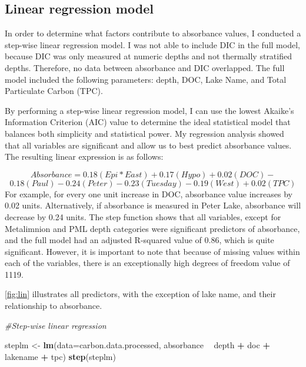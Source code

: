 \documentclass[12pt,]{article}
\newenvironment{Shaded}{\begin{snugshade}}{\end{snugshade}}
\newcommand{\KeywordTok}[1]{\textcolor[rgb]{0.13,0.29,0.53}{\textbf{#1}}}
\newcommand{\DataTypeTok}[1]{\textcolor[rgb]{0.13,0.29,0.53}{#1}}
\newcommand{\StringTok}[1]{\textcolor[rgb]{0.31,0.60,0.02}{#1}}
\newcommand{\CommentTok}[1]{\textcolor[rgb]{0.56,0.35,0.01}{\textit{#1}}}
\newcommand{\OperatorTok}[1]{\textcolor[rgb]{0.81,0.36,0.00}{\textbf{#1}}}
\newcommand{\NormalTok}[1]{#1}
\begin{document}
\subsection{Linear regression model}\label{linear-regression-model}

In order to determine what factors contribute to absorbance values, I
conducted a step-wise linear regression model. I was not able to include
DIC in the full model, because DIC was only measured at numeric depths
and not thermally stratified depths. Therefore, no data between
absorbance and DIC overlapped. The full model included the following
parameters: depth, DOC, Lake Name, and Total Particulate Carbon (TPC).

By performing a step-wise linear regression model, I can use the lowest
Akaike's Information Criterion (AIC) value to determine the ideal
statistical model that balances both simplicity and statistical power.
My regression analysis showed that all variables are significant and
allow us to best predict absorbance values. The resulting linear
expression is as follows:

\[Absorbance = 0.18(Epi*East) + 0.17(Hypo) + 0.02(DOC) -\]
\[0.18(Paul)  - 0.24(Peter) - 0.23(Tuesday) - 0.19(West) + 0.02(TPC) \]
For example, for every one unit increase in DOC, absorbance value
increases by 0.02 units. Alternatively, if absorbance is measured in
Peter Lake, absorbance will decrease by 0.24 units. The step function
shows that all variables, except for Metalimnion and PML depth
categories were significant predictors of absorbance, and the full model
had an adjusted R-squared value of 0.86, which is quite significant.
However, it is important to note that because of missing values within
each of the variables, there is an exceptionally high degrees of freedom
value of 1119.

\autoref{fig:lin} illustrates all predictors, with the exception of lake
name, and their relationship to absorbance.

\begin{Shaded}
\begin{Highlighting}[]
\CommentTok{#Step-wise linear regression}

\NormalTok{steplm <-}\StringTok{ }\KeywordTok{lm}\NormalTok{(}\DataTypeTok{data=}\NormalTok{carbon.data.processed, absorbance }\OperatorTok{~}\StringTok{ }\NormalTok{depth }\OperatorTok{+}\StringTok{ }\NormalTok{doc  }\OperatorTok{+}\StringTok{ }\NormalTok{lakename }\OperatorTok{+}\StringTok{ }\NormalTok{tpc)}
\KeywordTok{step}\NormalTok{(steplm) }
\end{Highlighting}
\end{Shaded}
\end{document}
